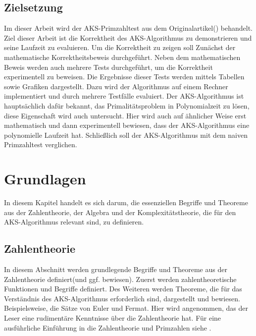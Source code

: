 \documentclass[12pt,oneside]{article}
\theoremstyle{remark}
\theoremstyle{definition}
\begin{document}
\subsection{Zielsetzung}
Im dieser Arbeit wird der AKS-Primzahltest aus dem Originalartikel(\cite{aks}) behandelt. Ziel dieser Arbeit ist die Korrektheit des AKS-Algorithmus zu demonstrieren und seine Laufzeit zu evaluieren. Um die Korrektheit zu zeigen soll Zunächst der mathematische Korrektheitsbeweis durchgeführt. Neben dem mathematischen Beweis werden auch mehrere Tests durchgeführt, um die Korrektheit experimentell zu beweisen. Die Ergebnisse dieser Tests werden mittels Tabellen sowie Grafiken dargestellt. Dazu wird der Algorithmus auf einem Rechner implementiert und durch mehrere Testfälle evaluiert. Der AKS-Algorithmus ist hauptsächlich dafür bekannt, das Primalitätsproblem in Polynomialzeit zu lösen, diese Eigenschaft wird auch untersucht. Hier wird auch auf ähnlicher Weise erst mathematisch und dann experimentell bewiesen, dass der AKS-Algorithmus eine polynomielle Laufzeit hat. Schließlich soll der AKS-Algorithmus mit dem naiven Primzahltest verglichen.  


\newpage


\section{Grundlagen}
In diesem Kapitel handelt es sich darum, die essenziellen Begriffe und Theoreme aus der Zahlentheorie, der Algebra und der Komplexitätstheorie, die für den AKS-Algorithmus relevant sind, zu definieren.

\smallskip


\subsection{Zahlentheorie}
In diesem Abschnitt werden grundlegende Begriffe und Theoreme aus der Zahlentheorie definiert(und ggf. bewiesen). Zuerst werden zahlentheoretische Funktionen und Begriffe definiert. Des Weiteren werden Theoreme, die für das Verständnis des AKS-Algorithmus erforderlich sind, dargestellt und bewiesen. Beispielsweise, die Sätze von Euler und Fermat. Hier wird angenommen, das der Leser eine rudimentäre Kenntnisse über die Zahlentheorie hat. Für eine ausführliche Einführung in die Zahlentheorie und Primzahlen siehe \cite{prime-numbers}.\newline
\end{document}
